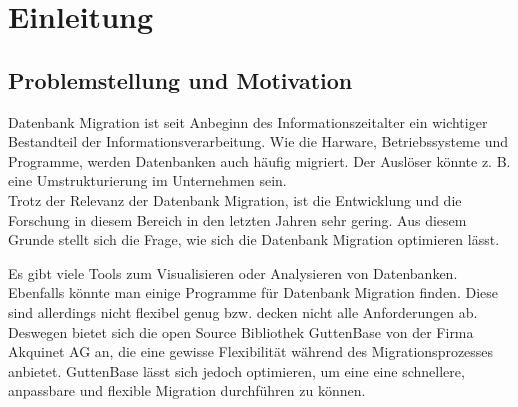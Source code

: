 \chapter{Einleitung}

\section{Problemstellung und Motivation}


Datenbank Migration ist seit Anbeginn des Informationszeitalter ein wichtiger Bestandteil der Informationsverarbeitung. Wie die Harware, Betriebssysteme und Programme, werden Datenbanken auch häufig migriert. Der Auslöser könnte z. B. eine Umstrukturierung im Unternehmen sein. \\
Trotz der Relevanz der Datenbank Migration, ist die Entwicklung und die Forschung in diesem Bereich in den letzten Jahren sehr gering. Aus diesem Grunde stellt sich die Frage, wie sich die Datenbank Migration optimieren lässt.

Es gibt viele Tools zum Visualisieren oder Analysieren von  Datenbanken. Ebenfalls könnte man einige Programme für Datenbank Migration finden. Diese sind allerdings nicht flexibel genug bzw. decken nicht alle Anforderungen ab. Deswegen bietet sich die open Source Bibliothek GuttenBase von der Firma Akquinet AG an, die eine gewisse Flexibilität während des Migrationsprozesses anbietet. GuttenBase lässt sich jedoch optimieren, um eine eine schnellere, anpassbare und flexible Migration durchführen zu können. 
